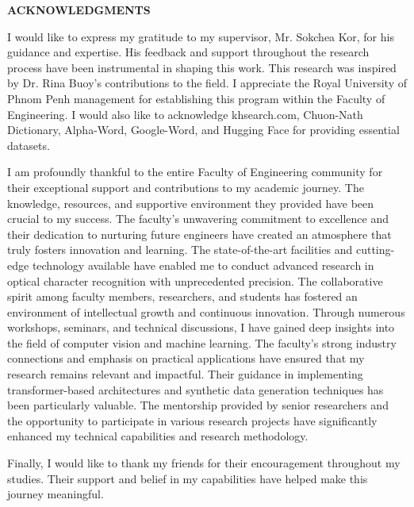 \begin{adjustwidth}{0.2cm}{0.2cm}

    \begin{center}
        {\englishfont\fontsize{14pt}{21pt}\selectfont \textbf{ACKNOWLEDGMENTS} \par}
    \end{center}
    \label{acknowledgements}

    \vspace{1cm}
    \setlength{\parindent}{2em}
    {\large I would like to express my gratitude to my supervisor, Mr. Sokchea Kor, for his guidance and expertise. His feedback and support throughout the research process have been instrumental in shaping this work. This research was inspired by Dr. Rina Buoy's contributions to the field. I appreciate the Royal University of Phnom Penh management for establishing this program within the Faculty of Engineering. I would also like to acknowledge khsearch.com, Chuon-Nath Dictionary, Alpha-Word, Google-Word, and Hugging Face for providing essential datasets.\par}

    \vspace{0.5cm}
    {\large I am profoundly thankful to the entire Faculty of Engineering community for their exceptional support and contributions to my academic journey. The knowledge, resources, and supportive environment they provided have been crucial to my success. The faculty's unwavering commitment to excellence and their dedication to nurturing future engineers have created an atmosphere that truly fosters innovation and learning. The state-of-the-art facilities and cutting-edge technology available have enabled me to conduct advanced research in optical character recognition with unprecedented precision. The collaborative spirit among faculty members, researchers, and students has fostered an environment of intellectual growth and continuous innovation. Through numerous workshops, seminars, and technical discussions, I have gained deep insights into the field of computer vision and machine learning. The faculty's strong industry connections and emphasis on practical applications have ensured that my research remains relevant and impactful. Their guidance in implementing transformer-based architectures and synthetic data generation techniques has been particularly valuable. The mentorship provided by senior researchers and the opportunity to participate in various research projects have significantly enhanced my technical capabilities and research methodology.\par}

    \vspace{0.5cm}
    {\large Finally, I would like to thank my friends for their encouragement throughout my studies. Their support and belief in my capabilities have helped make this journey meaningful.\par}

\end{adjustwidth}